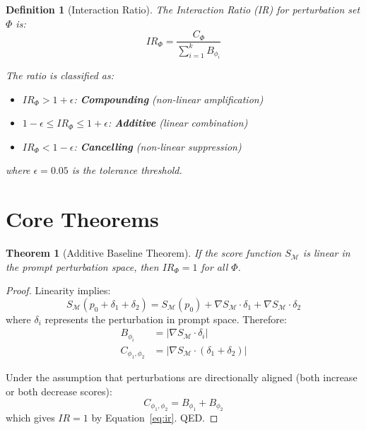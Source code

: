 \documentclass[11pt]{article}
\newtheorem{theorem}{Theorem}
\newtheorem{definition}{Definition}
\newtheorem{proof}{Proof}
\begin{document}
\begin{definition}[Interaction Ratio]
The Interaction Ratio (IR) for perturbation set $\Phi$ is:
\begin{equation}
\label{eq:ir}
IR_\Phi = \frac{C_\Phi}{\sum_{i=1}^k B_{\phi_i}}
\end{equation}

The ratio is classified as:
\begin{itemize}
    \item $IR_\Phi > 1 + \epsilon$: \textbf{Compounding} (non-linear amplification)
    \item $1 - \epsilon \leq IR_\Phi \leq 1 + \epsilon$: \textbf{Additive} (linear combination)
    \item $IR_\Phi < 1 - \epsilon$: \textbf{Cancelling} (non-linear suppression)
\end{itemize}
where $\epsilon = 0.05$ is the tolerance threshold.
\end{definition}

\section{Core Theorems}

\begin{theorem}[Additive Baseline Theorem]
If the score function $S_\mathcal{M}$ is linear in the prompt perturbation space, then $IR_\Phi = 1$ for all $\Phi$.
\end{theorem}

\begin{proof}
Linearity implies:
\begin{equation}
S_\mathcal{M}(p_0 + \delta_1 + \delta_2) = S_\mathcal{M}(p_0) + \nabla S_\mathcal{M} \cdot \delta_1 + \nabla S_\mathcal{M} \cdot \delta_2
\end{equation}
where $\delta_i$ represents the perturbation in prompt space. Therefore:
\begin{align}
B_{\phi_i} &= |\nabla S_\mathcal{M} \cdot \delta_i| \\
C_{\phi_1,\phi_2} &= |\nabla S_\mathcal{M} \cdot (\delta_1 + \delta_2)|
\end{align}

Under the assumption that perturbations are directionally aligned (both increase or both decrease scores):
\begin{equation}
C_{\phi_1,\phi_2} = B_{\phi_1} + B_{\phi_2}
\end{equation}
which gives $IR = 1$ by Equation~\ref{eq:ir}. QED.
\end{proof}
\end{document}
